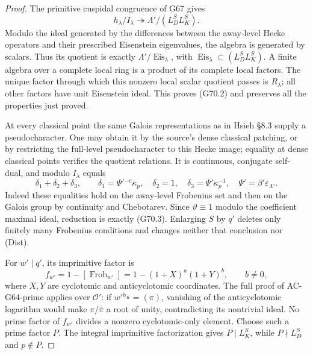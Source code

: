 \begin{proof}
The primitive cuspidal congruence of G67 gives
\[
 h_\lambda/I_\lambda\twoheadrightarrow
                       \Lambda'/(L_D^S L_K^S).
                                                        \tag{G70.6}
\]
Modulo the ideal generated by the differences between the
away-level Hecke operators and their prescribed Eisenstein
eigenvalues, the algebra is generated by scalars.
Thus its quotient is exactly
$\Lambda'/\operatorname{Eis}_\lambda$, with
$\operatorname{Eis}_\lambda\subset(L_D^SL_K^S)$.
A finite algebra over a complete local ring is a product
of its complete local factors.  The unique factor through
which this nonzero local scalar quotient passes is
$R_\lambda$; all other factors have unit Eisenstein ideal.
This proves (G70.2) and preserves all the properties just
proved.

At every classical point the same Galois representations
as in Hsieh \S8.3 supply a pseudocharacter.  One may obtain
it by the source's dense classical patching, or by restricting
the full-level pseudocharacter to this Hecke image; equality
at dense classical points verifies the quotient relations.
It is continuous, conjugate self-dual, and modulo
$I_\lambda$ equals
\[
 \delta_1+\delta_2+\delta_3,
 \qquad
 \delta_1=\Psi'{}^{-c}\kappa_p,\quad\delta_2=1,
 \quad\delta_3=\Psi'\kappa_p^{-1},
 \quad\Psi'=\beta'\varepsilon_{\Lambda'}.
                                                        \tag{G70.7}
\]
Indeed these equalities hold on the away-level Frobenius
set and then on the Galois group by continuity and
Chebotarev.  Since $\vartheta\equiv1$ modulo the coefficient
maximal ideal, reduction is exactly (G70.3).
Enlarging $S$ by $q'$ deletes only finitely many Frobenius
conditions and changes neither that conclusion nor
\textup{(Dist)}.

For $w'\mid q'$, its imprimitive factor is
\[
 f_{w'}=1-[\operatorname{Frob}_{w'}]
       =1-(1+X)^a(1+Y)^b,\qquad b\ne0,
                                                        \tag{G70.8}
\]
where $X,Y$ are cyclotomic and anticyclotomic coordinates.
The full proof of AC-G64-prime applies over $\mathcal O'$:
if $w'{}^{h_K}=(\pi)$, vanishing of the anticyclotomic
logarithm would make $\pi/\bar\pi$ a root of unity,
contradicting its nontrivial ideal.  No prime factor of
$f_{w'}$ divides a nonzero cyclotomic-only element.
Choose such a prime factor $P$.  The integral imprimitive
factorization gives $P\mid L_K^S$, while $P\nmid L_D^S$
and $p\notin P$.


\end{proof}
